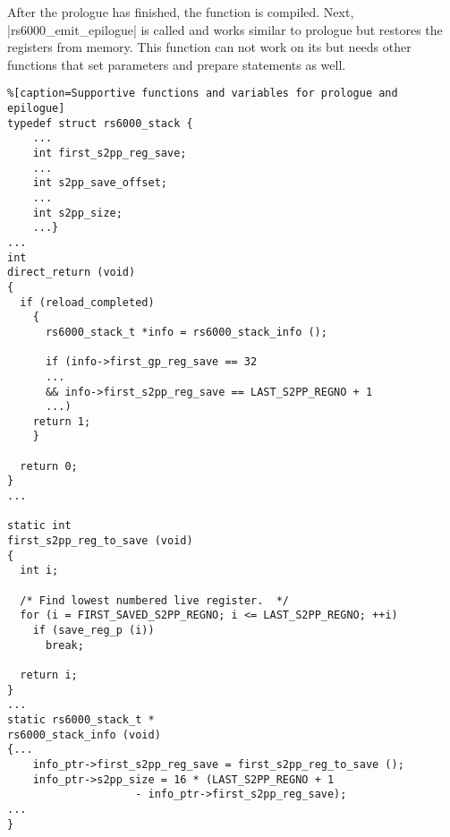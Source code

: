 After the prologue has finished, the function is compiled.
Next, |rs6000_emit_epilogue| is called and works similar to prologue but restores the registers from memory.
This function can not work on its but needs other functions that set parameters and prepare statements as well.
\begin{lstlisting}%[caption=Supportive functions and variables for prologue and epilogue]
typedef struct rs6000_stack {
    ...
    int first_s2pp_reg_save;
    ...
    int s2pp_save_offset;
    ...
    int s2pp_size;
    ...}
...
int
direct_return (void)
{
  if (reload_completed)
    {
      rs6000_stack_t *info = rs6000_stack_info ();

      if (info->first_gp_reg_save == 32
      ...
      && info->first_s2pp_reg_save == LAST_S2PP_REGNO + 1
      ...)
    return 1;
    }

  return 0;
}
...

static int
first_s2pp_reg_to_save (void)
{
  int i;

  /* Find lowest numbered live register.  */
  for (i = FIRST_SAVED_S2PP_REGNO; i <= LAST_S2PP_REGNO; ++i)
    if (save_reg_p (i))
      break;

  return i;
}
...
static rs6000_stack_t *
rs6000_stack_info (void)
{...
    info_ptr->first_s2pp_reg_save = first_s2pp_reg_to_save ();
    info_ptr->s2pp_size = 16 * (LAST_S2PP_REGNO + 1
                    - info_ptr->first_s2pp_reg_save);
...
}
\end{lstlisting}

